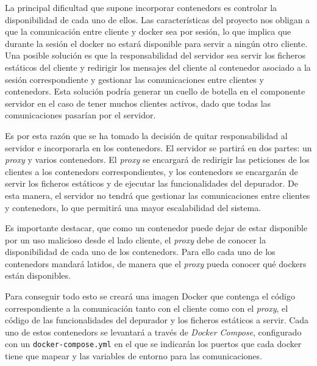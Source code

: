 La principal dificultad que supone incorporar \glspl{contenedor} es controlar la disponibilidad de cada uno de ellos. Las características del proyecto nos obligan a que la comunicación entre cliente y docker sea por sesión, lo que implica que durante la sesión el docker no estará disponible para servir a ningún otro cliente. Una posible solución es que la responsabilidad del servidor sea servir los ficheros estáticos del cliente y redirigir los mensajes del cliente al contenedor asociado a la sesión correspondiente y gestionar las comunicaciones entre clientes y \glspl{contenedor}. Esta solución podría generar un \gls{cuello de botella} en el componente servidor en el caso de tener muchos clientes activos, dado que todas las comunicaciones pasarían por el servidor.


Es por esta razón que se ha tomado la decisión de quitar responsabilidad al servidor e incorporarla en los \glspl{contenedor}. El servidor se partirá en dos partes: un \textit{\gls{proxy}} y varios \glspl{contenedor}. El \textit{\gls{proxy}} se encargará de redirigir las peticiones de los clientes a los \glspl{contenedor} correspondientes, y los \glspl{contenedor} se encargarán de servir los ficheros estáticos y de ejecutar las funcionalidades del depurador. De esta manera, el servidor no tendrá que gestionar las comunicaciones entre clientes y \glspl{contenedor}, lo que permitirá una mayor escalabilidad del sistema.


Es importante destacar, que como un \gls{contenedor} puede dejar de estar disponible por un uso malicioso desde el lado cliente, el \textit{\gls{proxy}} debe de conocer la disponibilidad de cada uno de los \glspl{contenedor}. Para ello cada uno de los \glspl{contenedor} mandará latidos, de manera que el \textit{\gls{proxy}} pueda conocer qué dockers están disponibles.

Para conseguir todo esto se creará una \gls{imagen Docker} que contenga el código correspondiente a la comunicación tanto con el cliente como con el \textit{\gls{proxy}}, el código de las funcionalidades del depurador y los ficheros estáticos a servir. Cada uno de estos \glspl{contenedor} se levantará a través de \textit{Docker Compose}, configurado con un \texttt{docker-compose.yml} en el que se indicarán los puertos que cada docker tiene que mapear y las variables de entorno para las comunicaciones. 


